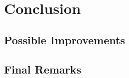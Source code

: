 \chapter{Conclusion}

\label{chap:Concl}



\section{Possible Improvements}



\section{Final Remarks}

